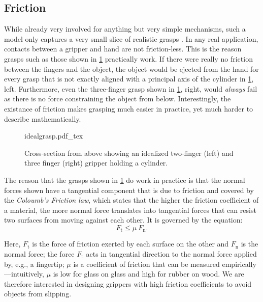 \subsection{Friction}\label{sec:grasping_friction}

While already very involved for anything but very simple mechanisms, such a model only captures a very small slice of realistic grasps .
In any real application, contacts between a gripper and hand are not friction-less. This is the reason grasps such as those shown in \cref{fig:idealgrasp} practically work. If there were really no friction between the fingers and the object, the object would be ejected from the hand for every grasp that is not exactly aligned with a principal axis of the cylinder in \cref{fig:idealgrasp}, left. Furthermore, even the three-finger grasp shown in \cref{fig:idealgrasp}, right, would \textsl{always} fail as there is no force constraining the object from below. Interestingly, the existance of friction makes grasping much easier in practice, yet much harder to describe mathematically.

\begin{figure}
    \def\svgwidth{\textwidth}
    {idealgrasp.pdf_tex}
    \caption{Cross-section from above showing an idealized two-finger (left) and three finger (right) gripper holding a cylinder.\label{fig:idealgrasp}
    }
\end{figure}

The reason that the grasps shown in \cref{fig:idealgrasp} do work in practice is that the normal forces shown have a tangential component that is due to friction and covered by the \textsl{Coloumb's Friction law},
which states that the higher the friction coefficient of a material, the more normal force translates into tangential forces that can resist two surfaces from moving against each other.
It is governed by the equation:
\begin{equation}
F_\mathrm{t} \leq \mu\ F_\mathrm{n}.
\end{equation}

Here, $F_\mathrm{t}$  is the force of friction exerted by each surface on the other and $F_\mathrm{n}$ is the normal force; the force $F_\mathrm{t}$ acts in tangential direction to the normal force applied by, e.g., a fingertip; $\mu$ is a coefficient of friction that can be measured empirically---intuitively, $\mu$ is low for glass on glass and high for rubber on wood.
We are therefore interested in designing grippers with high friction coefficients to avoid objects from slipping.

